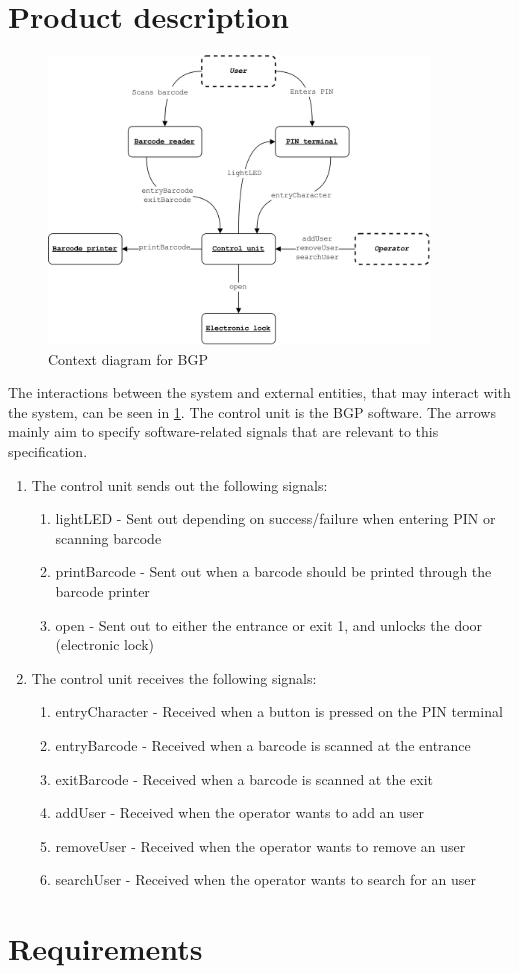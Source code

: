 \documentclass[12pt,titlepage,bibliography=totoc]{article}
\begin{document}
\section{Product description}
\begin{figure}
	\centering
	\includegraphics[width=0.9\textwidth]{./assets/context-hw-nobox.png}
	\caption{Context diagram for BGP}
	\label{fig:context-hw}
\end{figure}

The interactions between the system and external entities, that may interact with the system, can be seen in \cref{fig:context-hw}. The control unit is the BGP software. The arrows mainly aim to specify software-related signals that are relevant to this specification.

\begin{enumerate}
	\item The control unit sends out the following signals:
	\begin{enumerate}
		\item lightLED - Sent out depending on success/failure when entering PIN or scanning barcode
		\item printBarcode - Sent out when a barcode should be printed through the barcode printer
		\item open - Sent out to either the entrance or exit 1, and unlocks the door (electronic lock)
	\end{enumerate}
	\item The control unit receives the following signals:
	\begin{enumerate}
		\item entryCharacter - Received when a button is pressed on the PIN terminal
		\item entryBarcode - Received when a barcode is scanned at the entrance
		\item exitBarcode - Received when a barcode is scanned at the exit
		\item addUser - Received when the operator wants to add an user
		\item removeUser - Received when the operator wants to remove an user
		\item searchUser - Received when the operator wants to search for an user
	\end{enumerate}
\end{enumerate}

\section{Requirements}



{}


\end{document}
